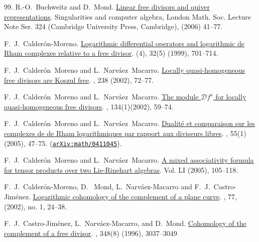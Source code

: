 \documentclass[12pt]{article}
\begin{document}
\begin{thebibliography}{99.}
 R.-O.~Buchweitz and D.~Mond.
\newblock \href{https://doi.org/10.1017/CBO9780511526374.006}{Linear free divisors and quiver representations}.
\newblock Singularities and computer algebra, London Math. Soc. Lecture Note Ser. 324 (Cambridge University Press, Cambridge), (2006) 41--77.

F.~J.~Calder{\'o}n-Moreno.
\newblock \href{https://doi.org/10.1016/S0012-9593(01)80004-5}{Logarithmic differential operators and logarithmic de {R}ham complexes relative to a free divisor}.
 (4), 32(5) (1999), 701--714.

F.~J.~Calder\'{o}n~Moreno and L.~Narv\'{a}ez~Macarro.
\newblock \href{https://www.mathnet.ru/eng/tm/v238/p81}{Locally quasi-homogeneous free divisors are Koszul free}.
, 238 (2002), 72--77.

F.~J.~Calder\'{o}n~Moreno and L.~Narv\'{a}ez~Macarro.
\newblock   \href{https://doi.org/10.1023/A:1020228824102}{The module $\mathcal{D} f^s$ for locally quasi-homogeneous free divisors}.
, 134(1)(2002), 59--74.

F.~J.~Calder\'{o}n~Moreno and L.~Narv\'{a}ez~Macarro.
\newblock \href{http://aif.cedram.org/item?id=AIF_2005__55_1_47_0}{Dualit\'{e} et comparaison sur les complexes de de Rham logarithmiques par rapport aux diviseurs libres}.
, 55(1) (2005), 47--75.
\newblock (\href{https://doi.org/10.48550/arXiv.math/0411045}{\tt arXiv:math/0411045}).

F.~J.~Calder\'{o}n~Moreno and L.~Narv\'{a}ez~Macarro.
\newblock \href{https://doi.org/10.1007/BF02824826}{A mixed associativity formula for tensor products over two Lie-Rinehart algebras}.
 Vol. LI (2005), 105--118.

 F.~J.~Calder\'on-Moreno, D.~ Mond, L.~Narv\'aez-Macarro and F.~J.~Castro-Jim\'enez.
\newblock \href{https://doi.org/10.1007/s00014-002-8330-6}{Logarithmic cohomology of the complement of a plane curve}.
, 77, (2002), no. 1, 24--38.

 F.~J.~Castro-Jim\'enez, L.~Narv\'aez-Macarro, and D.~Mond.
\newblock \href{https://doi.org/10.1090/S0002-9947-96-01690-X}{Cohomology of the complement of a free divisor}.
, 348(8) (1996), 3037--3049


\end{thebibliography}
\end{document}

